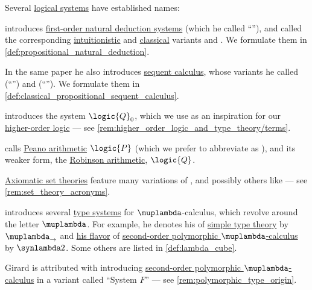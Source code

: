 \begin{remark}\label{rem:named_logical_systems}
  Several \hyperref[con:logical_system]{logical systems} have established names:
  \begin{itemize}
     \Textcite[176]{Gentzen1935LogischeSchließen} introduces \hyperref[def:fol_natural_deduction]{first-order natural deduction systems} (which he called \enquote{}), and called the corresponding \hyperref[con:intuitionistic_logic]{intuitionistic} and \hyperref[con:classical_logic]{classical} variants  and . We formulate them in \cref{def:propositional_natural_deduction}.

    In the same paper he also introduces \hyperref[def:abstract_sequent_calculus_system]{sequent calculus}, whose variants he called  (\enquote{}) and  (\enquote{}). We formulate them in \cref{def:classical_propositional_sequent_calculus}.

     \Textcite[\S 51]{Andrews2002Logic} introduces the system \( \logic{Q}_0 \), which we use as an inspiration for our \hyperref[def:higher_order_logic]{higher-order logic} --- see \cref{rem:higher_order_logic_and_type_theory/terms}.

     \Textcite[def. 4.1.1]{Hinman2005Logic} calls \hyperref[def:peano_arithmetic]{Peano arithmetic} \( \logic{P} \) (which we prefer to abbreviate as ), and its weaker form, the \hyperref[def:peano_arithmetic]{Robinson arithmetic}, \( \logic{Q} \).

     \hyperref[def:axiomatic_set_theory]{Axiomatic set theories} feature many variations of , and possibly others like  --- see \cref{rem:set_theory_acronyms}.

     \Textcite{Barendregt1992LambdaCalculiWithTypes} introduces several \hyperref[def:abstract_type_system]{type systems} for \( \muplambda \)-calculus, which revolve around the letter \( \muplambda \). For example, he denotes his of \hyperref[con:simple_type_theory]{simple type theory} by \( \muplambda_{\rightarrow} \) and \hyperref[def:lambda_cube/type_on_term]{his flavor} of \hyperref[def:polymorphic_typed_lambda_calculus]{second-order polymorphic \( \muplambda \)-calculus} by \( \synlambda 2 \). Some others are listed in \cref{def:lambda_cube}.

     Girard is attributed with introducing \hyperref[def:polymorphic_typed_lambda_calculus]{second-order polymorphic \( \muplambda \)-calculus} in a variant called \enquote{System \( F \)} --- see \cref{rem:polymorphic_type_origin}.
  \end{itemize}
\end{remark}

